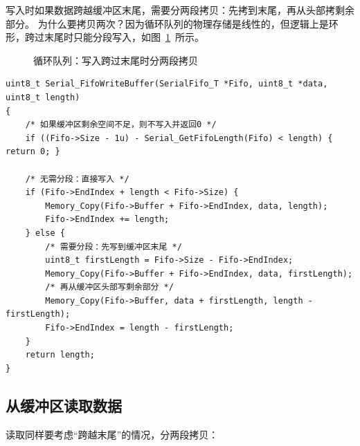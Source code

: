写入时如果数据跨越缓冲区末尾，需要分两段拷贝：先拷到末尾，再从头部拷剩余部分。 为什么要拷贝两次？因为循环队列的物理存储是线性的，但逻辑上是环形，跨过末尾时只能分段写入，如图~\ref{fig:fifo}~所示。

\begin{figure}[htbp]
\centering
\caption{循环队列：写入跨过末尾时分两段拷贝} \label{fig:fifo}
\end{figure}

\begin{lstlisting}[style=c]
uint8_t Serial_FifoWriteBuffer(SerialFifo_T *Fifo, uint8_t *data, uint8_t length)
{
    /* 如果缓冲区剩余空间不足，则不写入并返回0 */
    if ((Fifo->Size - 1u) - Serial_GetFifoLength(Fifo) < length) { return 0; }

    /* 无需分段：直接写入 */
    if (Fifo->EndIndex + length < Fifo->Size) {
        Memory_Copy(Fifo->Buffer + Fifo->EndIndex, data, length);
        Fifo->EndIndex += length;
    } else {
        /* 需要分段：先写到缓冲区末尾 */
        uint8_t firstLength = Fifo->Size - Fifo->EndIndex;
        Memory_Copy(Fifo->Buffer + Fifo->EndIndex, data, firstLength);
        /* 再从缓冲区头部写剩余部分 */
        Memory_Copy(Fifo->Buffer, data + firstLength, length - firstLength);
        Fifo->EndIndex = length - firstLength;
    }
    return length;
}
\end{lstlisting}
\subsection{从缓冲区读取数据}

读取同样要考虑“跨越末尾”的情况，分两段拷贝：

